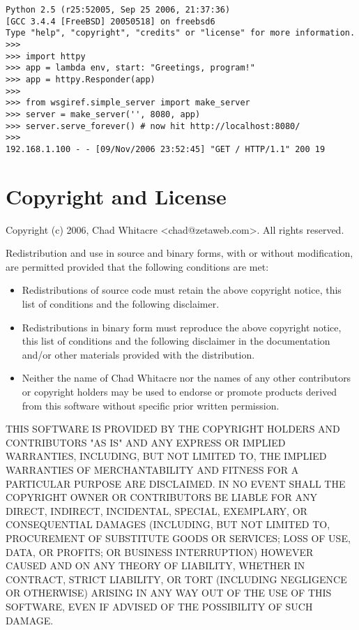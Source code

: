 \documentclass{manual}
\begin{document}
\begin{verbatim}
Python 2.5 (r25:52005, Sep 25 2006, 21:37:36)
[GCC 3.4.4 [FreeBSD] 20050518] on freebsd6
Type "help", "copyright", "credits" or "license" for more information.
>>>
>>> import httpy
>>> app = lambda env, start: "Greetings, program!"
>>> app = httpy.Responder(app)
>>>
>>> from wsgiref.simple_server import make_server
>>> server = make_server('', 8080, app)
>>> server.serve_forever() # now hit http://localhost:8080/
>>>
192.168.1.100 - - [09/Nov/2006 23:52:45] "GET / HTTP/1.1" 200 19
\end{verbatim}

\chapter{Copyright and License \label{legal}}

Copyright (c) 2006, Chad Whitacre <chad@zetaweb.com>. All rights reserved.

Redistribution and use in source and binary forms, with or without modification,
are permitted provided that the following conditions are met:

\begin{itemize}

\item{Redistributions of source code must retain the above copyright notice,
this list of conditions and the following disclaimer.}

\item{Redistributions in binary form must reproduce the above copyright notice,
this list of conditions and the following disclaimer in the documentation and/or
other materials provided with the distribution.}

\item{Neither the name of Chad Whitacre nor the names of any other contributors
or copyright holders may be used to endorse or promote products derived from
this software without specific prior written permission.}

\end{itemize}

THIS SOFTWARE IS PROVIDED BY THE COPYRIGHT HOLDERS AND CONTRIBUTORS "AS IS" AND
ANY EXPRESS OR IMPLIED WARRANTIES, INCLUDING, BUT NOT LIMITED TO, THE IMPLIED
WARRANTIES OF MERCHANTABILITY AND FITNESS FOR A PARTICULAR PURPOSE ARE
DISCLAIMED. IN NO EVENT SHALL THE COPYRIGHT OWNER OR CONTRIBUTORS BE LIABLE FOR
ANY DIRECT, INDIRECT, INCIDENTAL, SPECIAL, EXEMPLARY, OR CONSEQUENTIAL DAMAGES
(INCLUDING, BUT NOT LIMITED TO, PROCUREMENT OF SUBSTITUTE GOODS OR SERVICES;
LOSS OF USE, DATA, OR PROFITS; OR BUSINESS INTERRUPTION) HOWEVER CAUSED AND ON
ANY THEORY OF LIABILITY, WHETHER IN CONTRACT, STRICT LIABILITY, OR TORT
(INCLUDING NEGLIGENCE OR OTHERWISE) ARISING IN ANY WAY OUT OF THE USE OF THIS
SOFTWARE, EVEN IF ADVISED OF THE POSSIBILITY OF SUCH DAMAGE.
\end{document}
